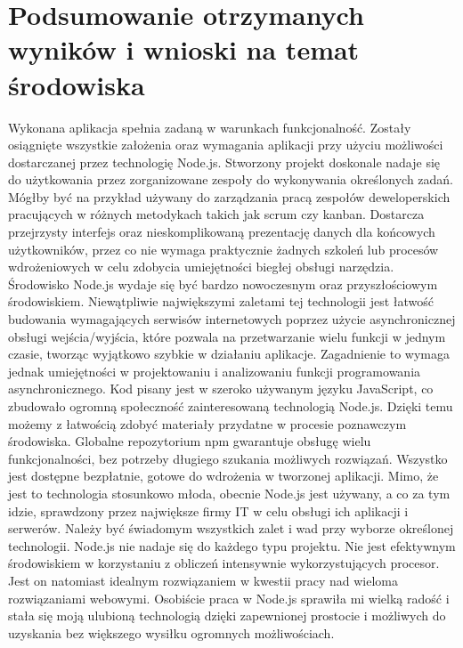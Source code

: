 \documentclass[12pt]{report}
\begin{document}
\chapter{Podsumowanie otrzymanych wyników i wnioski na temat środowiska}
Wykonana aplikacja spełnia zadaną w warunkach funkcjonalność. 
Zostały osiągnięte wszystkie założenia oraz wymagania aplikacji przy użyciu możliwości dostarczanej przez technologię Node.js. 
Stworzony projekt doskonale nadaje się do użytkowania przez zorganizowane zespoły do wykonywania określonych zadań. 
Mógłby być na przykład używany do zarządzania pracą zespołów deweloperskich pracujących w różnych metodykach takich jak scrum czy kanban. 
Dostarcza przejrzysty interfejs oraz nieskomplikowaną prezentację danych dla końcowych użytkowników, przez co nie wymaga praktycznie żadnych szkoleń lub procesów wdrożeniowych w celu zdobycia umiejętności biegłej obsługi narzędzia. 
Środowisko Node.js wydaje się być bardzo nowoczesnym oraz przyszłościowym środowiskiem. 
Niewątpliwie największymi zaletami tej technologii jest łatwość budowania wymagających serwisów internetowych poprzez użycie asynchronicznej obsługi wejścia/wyjścia, które pozwala na przetwarzanie wielu funkcji w jednym czasie, tworząc wyjątkowo szybkie w działaniu aplikacje. 
Zagadnienie to wymaga jednak umiejętności w projektowaniu i analizowaniu funkcji programowania asynchronicznego. 
Kod pisany jest w szeroko używanym języku JavaScript, co zbudowało ogromną społeczność zainteresowaną technologią Node.js. 
Dzięki temu możemy z łatwością zdobyć materiały przydatne w procesie poznawczym środowiska. 
Globalne repozytorium npm gwarantuje obsługę wielu funkcjonalności, bez potrzeby długiego szukania możliwych rozwiązań. 
Wszystko jest dostępne bezpłatnie, gotowe do wdrożenia w tworzonej aplikacji. 
Mimo, że jest to technologia stosunkowo młoda, obecnie Node.js jest używany, a co za tym idzie, sprawdzony przez największe firmy IT w celu obsługi ich aplikacji i serwerów. 
Należy być świadomym wszystkich zalet i wad przy wyborze określonej technologii. 
Node.js nie nadaje się do każdego typu projektu. 
Nie jest efektywnym środowiskiem w korzystaniu z obliczeń intensywnie wykorzystujących procesor. 
Jest on natomiast idealnym rozwiązaniem w kwestii pracy nad wieloma rozwiązaniami webowymi. 
Osobiście praca w Node.js sprawiła mi wielką radość i stała się moją ulubioną technologią dzięki zapewnionej prostocie i możliwych do uzyskania bez większego wysiłku ogromnych możliwościach.
\end{document}
